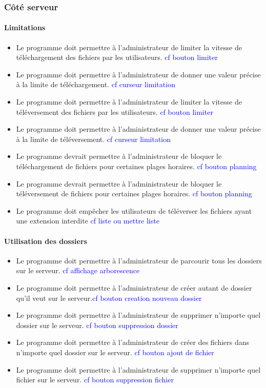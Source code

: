 \documentclass[10pt,a4paper]{report}
\begin{document}
\subsubsection{Côté serveur}
\paragraph{Limitations}
	\begin{itemize}
		\item Le programme doit permettre à l'administrateur de limiter la vitesse de téléchargement des fichiers par les utilisateurs. \textcolor{blue}{cf bouton limiter}
		\item Le programme doit permettre à l'administrateur de donner une valeur précise à la limite de téléchargement. \textcolor{blue}{cf curseur limitation}
		\item Le programme doit permettre à l'administrateur de limiter la vitesse de téléversement des fichiers par les utilisateurs. \textcolor{blue}{cf bouton limiter}
		\item Le programme doit permettre à l'administrateur de donner une valeur précise à la limite de téléversement. \textcolor{blue}{cf curseur limitation}
		\item Le programme devrait permettre à l'administrateur de bloquer le téléchargement de fichiers pour certaines plages horaires. \textcolor{blue}{cf bouton planning}
		\item Le programme devrait permettre à l'administrateur de bloquer le téléversement de fichiers pour certaines plages horaires. \textcolor{blue}{cf bouton planning}
		\item Le programme doit empêcher les utilisateurs de téléverser les fichiers ayant une extension interdite \textcolor{blue}{cf liste ou mettre liste}
	\end{itemize}
	
\paragraph{Utilisation des dossiers}
	\begin{itemize}
		\item Le programme doit permettre à l'administrateur de parcourir tous les dossiers sur le serveur. \textcolor{blue}{cf affichage arborescence}
		\item Le programme doit permettre à l'administrateur de créer autant de dossier qu'il veut sur le serveur.\textcolor{blue}{cf bouton creation nouveau dossier}
		\item Le programme doit permettre à l'administrateur de supprimer n'importe quel dossier sur le serveur. \textcolor{blue}{cf bouton suppression dossier}
		\item Le programme doit permettre à l'administrateur de créer des fichiers dans n'importe quel dossier sur le serveur. \textcolor{blue}{cf bouton ajout de fichier}
		\item Le programme doit permettre à l'administrateur de supprimer n'importe quel fichier sur le serveur. \textcolor{blue}{cf bouton suppression fichier}
	\end{itemize}
\end{document}
